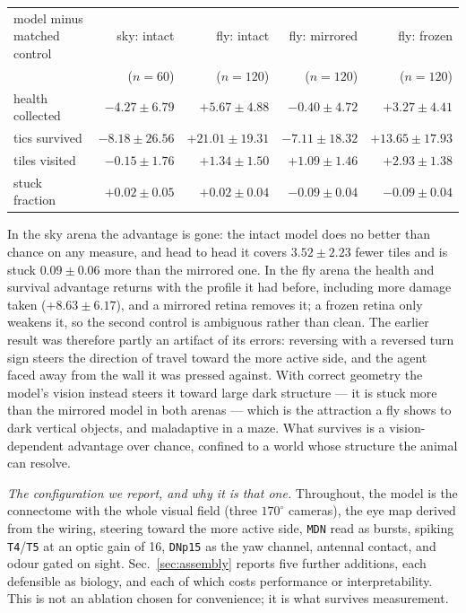\documentclass[10pt,twoside]{article}
\newcommand{\cell}[1]{\texttt{#1}}
\begin{document}
\begin{center}
\small
\begin{tabular}{lrrrr}
\toprule
model minus matched control & sky: intact & fly: intact & fly: mirrored & fly: frozen\\
& ($n=60$) & ($n=120$) & ($n=120$) & ($n=120$)\\
\midrule
health collected & $-4.27\pm6.79$ & $\mathbf{+5.67\pm4.88}$ & $-0.40\pm4.72$ & $+3.27\pm4.41$\\
tics survived    & $-8.18\pm26.56$ & $\mathbf{+21.01\pm19.31}$ & $-7.11\pm18.32$ & $+13.65\pm17.93$\\
tiles visited    & $-0.15\pm1.76$ & $+1.34\pm1.50$ & $+1.09\pm1.46$ & $\mathbf{+2.93\pm1.38}$\\
stuck fraction   & $+0.02\pm0.05$ & $+0.02\pm0.04$ & $\mathbf{-0.09\pm0.04}$ & $\mathbf{-0.09\pm0.04}$\\
\bottomrule
\end{tabular}
\end{center}

In the sky arena the advantage is gone: the intact model does no better than
chance on any measure, and head to head it covers $3.52\pm2.23$ fewer tiles and
is stuck $0.09\pm0.06$ more than the mirrored one. In the fly arena the health
and survival advantage returns with the profile it had before, including more
damage taken ($+8.63\pm6.17$), and a mirrored retina removes it; a frozen
retina only weakens it, so the second control is ambiguous rather than clean.
The earlier result was therefore partly an artifact of its errors: reversing
with a reversed turn sign steers the direction of travel toward the more active
side, and the agent faced away from the wall it was pressed against. With
correct geometry the model's vision instead steers it toward large dark
structure --- it is stuck more than the mirrored model in both arenas --- which
is the attraction a fly shows to dark vertical objects, and maladaptive in a
maze. What survives is a vision-dependent advantage over chance, confined to a
world whose structure the animal can resolve.

\emph{The configuration we report, and why it is that one.} Throughout, the
model is the connectome with the whole visual field (three $170^\circ$
cameras), the eye map derived from the wiring, steering toward the more active
side, \cell{MDN} read as bursts, spiking \cell{T4}/\cell{T5} at an optic gain
of 16, \cell{DNp15} as the yaw channel, antennal contact, and odour gated on
sight. Sec.~\ref{sec:assembly} reports five further additions, each defensible
as biology, and each of which costs performance or interpretability. This is
not an ablation chosen for convenience; it is what survives measurement.
\end{document}
